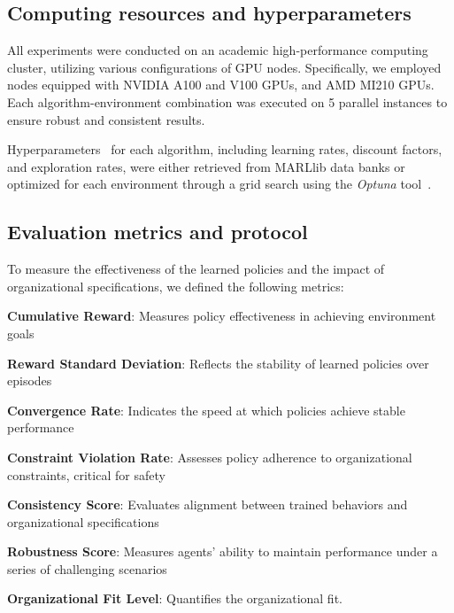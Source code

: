 \documentclass[pdflatex,sn-mathphys-num]{sn-jnl}%
\theoremstyle{thmstyleone}%
\theoremstyle{thmstyletwo}%
\theoremstyle{thmstylethree}%
\begin{document}
\subsection{Computing resources and hyperparameters}

All experiments were conducted on an academic high-performance computing cluster, utilizing various configurations of GPU nodes. Specifically, we employed nodes equipped with NVIDIA A100 and V100 GPUs, and AMD MI210 GPUs. Each algorithm-environment combination was executed on 5 parallel instances to ensure robust and consistent results. 

Hyperparameters~\hyperref[fn:github]{\footnotemark[1]} for each algorithm, including learning rates, discount factors, and exploration rates, were either retrieved from MARLlib data banks or optimized for each environment through a grid search using the \textit{Optuna} tool~\cite{akiba2019optuna}.

\subsection{Evaluation metrics and protocol}

To measure the effectiveness of the learned policies and the impact of organizational specifications, we defined the following metrics:
%
\begin{enumerate*}[label={\roman*)}, itemjoin={; \quad}]
    \item \textbf{Cumulative Reward}: Measures policy effectiveness in achieving environment goals
    \item \textbf{Reward Standard Deviation}: Reflects the stability of learned policies over episodes
    \item \textbf{Convergence Rate}: Indicates the speed at which policies achieve stable performance
    \item \textbf{Constraint Violation Rate}: Assesses policy adherence to organizational constraints, critical for safety
    \item \textbf{Consistency Score}: Evaluates alignment between trained behaviors and organizational specifications
    \item \textbf{Robustness Score}: Measures agents' ability to maintain performance under a series of challenging scenarios
    \item \textbf{Organizational Fit Level}: Quantifies the organizational fit.
\end{enumerate*}

\
\end{document}
